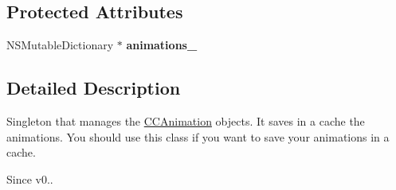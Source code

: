 \subsection*{Protected Attributes}
\begin{DoxyCompactItemize}
\item 
\hypertarget{interface_c_c_animation_cache_aea07c23c7d7de5989041b407a0afb7d1}{N\-S\-Mutable\-Dictionary $\ast$ {\bfseries animations\-\_\-}}\label{interface_c_c_animation_cache_aea07c23c7d7de5989041b407a0afb7d1}

\end{DoxyCompactItemize}


\subsection{Detailed Description}
Singleton that manages the \hyperlink{interface_c_c_animation}{C\-C\-Animation} objects. It saves in a cache the animations. You should use this class if you want to save your animations in a cache.

\begin{DoxySince}{Since}
v0.. 
\end{DoxySince}



